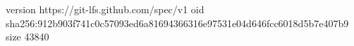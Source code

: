 version https://git-lfs.github.com/spec/v1
oid sha256:912b903f741c0c57093ed6a81694366316e97531e04d646fcc6018d5b7e407b9
size 43840
